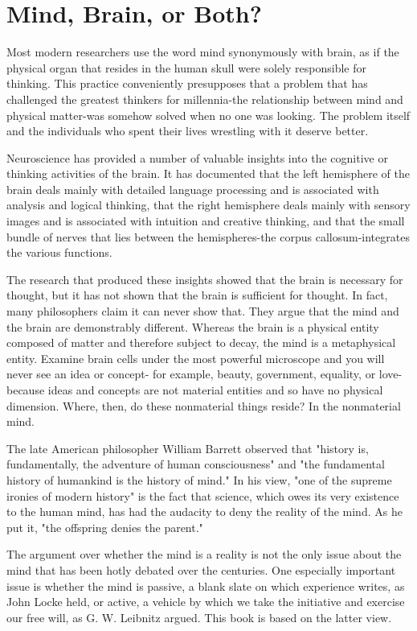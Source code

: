 \documentclass{book}
\begin{document}
\section{Mind, Brain, or Both?}

Most modern researchers use the word mind synonymously with brain, as if the physical organ that resides in the human skull were solely responsible for thinking. This practice conveniently presupposes that a problem that has challenged the greatest thinkers for millennia-the relationship between mind and physical matter-was somehow solved when no one was looking. The problem itself and the individuals who spent their lives wrestling with it deserve better.

Neuroscience has provided a number of valuable insights into the cognitive or thinking activities of the brain. It has documented that the left hemisphere of the brain deals mainly with detailed language processing and is associated with analysis and logical thinking, that the right hemisphere deals mainly with sensory images and is associated with intuition and creative thinking, and that the small bundle of nerves that lies between the hemispheres-the corpus callosum-integrates the various functions.

The research that produced these insights showed that the brain is necessary for thought, but it has not shown that the brain is sufficient for thought. In fact, many philosophers claim it can never show that. They argue that the mind and the brain are demonstrably different. Whereas the brain is a physical entity composed of matter and therefore subject to decay, the mind is a metaphysical entity. Examine brain cells under the most powerful microscope and you will never see an idea or concept- for example, beauty, government, equality, or love-because ideas and concepts are not material entities and so have no physical dimension. Where, then, do these nonmaterial things reside? In the nonmaterial mind.

The late American philosopher William Barrett observed that "history is, fundamentally, the adventure of human consciousness" and "the fundamental history of humankind is the history of mind." In his view, "one of the supreme ironies of modern history" is the fact that science, which owes its very existence to the human mind, has had the audacity to deny the reality of the mind. As he put it, "the offspring denies the parent."

The argument over whether the mind is a reality is not the only issue about the mind that has been hotly debated over the centuries. One especially important issue is whether the mind is passive, a blank slate on which experience writes, as John Locke held, or active, a vehicle by which we take the initiative and exercise our free will, as G. W. Leibnitz argued. This book is based on the latter view.
\end{document}

